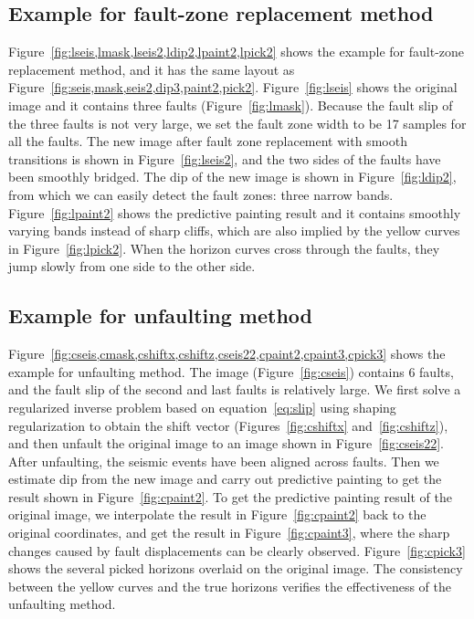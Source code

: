 \subsection{Example for fault-zone replacement method}

Figure~\ref{fig:lseis,lmask,lseis2,ldip2,lpaint2,lpick2} shows the example for fault-zone replacement method, and it has the same layout as Figure~\ref{fig:seis,mask,seis2,dip3,paint2,pick2}.
Figure~\ref{fig:lseis} shows the original image and it contains three faults (Figure~\ref{fig:lmask}).
Because the fault slip of the three faults is not very large, we set the fault zone width to be 17 samples for all the faults.
The new image after fault zone replacement with smooth transitions is shown in Figure~\ref{fig:lseis2}, and the two sides of the faults have been smoothly bridged.
The dip of the new image is shown in Figure~\ref{fig:ldip2}, from which we can easily detect the fault zones: three narrow bands.
Figure~\ref{fig:lpaint2} shows the predictive painting result and it contains smoothly varying bands instead of sharp cliffs,
which are also implied by the yellow curves in Figure~\ref{fig:lpick2}.
When the horizon curves cross through the faults, they jump slowly from one side to the other side.

\subsection{Example for unfaulting method}

Figure~\ref{fig:cseis,cmask,cshiftx,cshiftz,cseis22,cpaint2,cpaint3,cpick3} shows the example for unfaulting method.
The image (Figure~\ref{fig:cseis}) contains 6 faults, and the fault slip of the second and last faults is relatively large. 
We first solve a regularized inverse problem based on equation~\ref{eq:slip} using shaping regularization to obtain the shift vector (Figures~\ref{fig:cshiftx} and~\ref{fig:cshiftz}), and then unfault the original image to an image shown in Figure~\ref{fig:cseis22}.
After unfaulting, the seismic events have been aligned across faults.
Then we estimate dip from the new image and carry out predictive painting to get the result shown in Figure~\ref{fig:cpaint2}.
To get the predictive painting result of the original image, we interpolate the result in Figure~\ref{fig:cpaint2} back to the original coordinates, and get the result in Figure~\ref{fig:cpaint3},
where the sharp changes caused by fault displacements can be clearly observed.
Figure~\ref{fig:cpick3} shows the several picked horizons overlaid on the original image.
The consistency between the yellow curves and the true horizons verifies the effectiveness of the unfaulting method.

